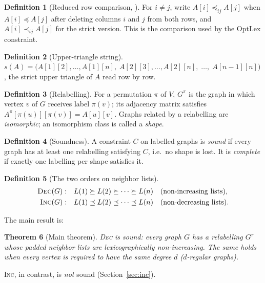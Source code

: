 \documentclass[11pt,a4paper]{article}
\newtheorem{theorem}{Theorem}
\theoremstyle{definition}
\newtheorem{definition}[theorem]{Definition}
\theoremstyle{remark}
\newcommand{\lex}{\preceq}
\newcommand{\Lst}{L}
\newcommand{\red}[2]{\mathrel{\preceq_{#1#2}}}
\newcommand{\sred}[2]{\mathrel{\prec_{#1#2}}}
\begin{document}
\begin{definition}[Reduced row comparison, \cite{codish13}]
For $i\neq j$, write $A[i]\red ij A[j]$ when $A[i]\lex A[j]$ after deleting columns $i$ and $j$
from both rows, and $A[i]\sred ij A[j]$ for the strict version.
This is the comparison used by the OptLex constraint.
\end{definition}

\begin{definition}[Upper-triangle string]
$s(A)=\bigl(A[1][2],\dots,A[1][n],\;A[2][3],\dots,A[2][n],\;\dots,\;A[n-1][n]\bigr)$,
the strict upper triangle of $A$ read row by row.
\end{definition}

\begin{definition}[Relabelling]
For a permutation $\pi$ of $V$, $G^\pi$ is the graph in which vertex $v$ of $G$ receives label
$\pi(v)$; its adjacency matrix satisfies $A^\pi[\pi(u)][\pi(v)]=A[u][v]$. Graphs related by
a relabelling are \emph{isomorphic}; an isomorphism class is called a \emph{shape}.
\end{definition}

\begin{definition}[Soundness]
A constraint $C$ on labelled graphs is \emph{sound} if every graph has at least one
relabelling satisfying $C$, i.e.\ no shape is lost. It is \emph{complete} if exactly one
labelling per shape satisfies it.
\end{definition}

\begin{definition}[The two orders on neighbor lists]
\begin{align*}
  \textsc{Dec}(G):&\quad \Lst(1)\succeq \Lst(2)\succeq\dots\succeq \Lst(n)
    &&\text{(non-increasing lists)},\\
  \textsc{Inc}(G):&\quad \Lst(1)\lex \Lst(2)\lex\dots\lex \Lst(n)
    &&\text{(non-decreasing lists)}.
\end{align*}
\end{definition}

The main result is:

\begin{theorem}[Main theorem]\label{thm:main}
\textsc{Dec} is sound: every graph $G$ has a relabelling $G^\pi$ whose padded neighbor
lists are lexicographically non-increasing. The same holds when every vertex is required
to have the same degree $d$ ($d$-regular graphs).
\end{theorem}

\textsc{Inc}, in contrast, is \emph{not} sound (Section~\ref{sec:inc}).
\end{document}
